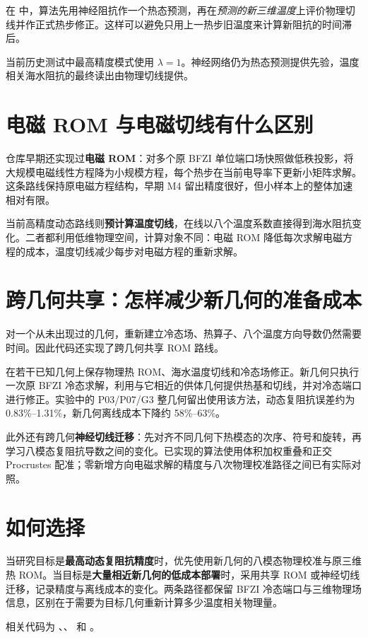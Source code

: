 在  中，算法先用神经阻抗作一个热态预测，再在\emph{预测的新三维温度}上评价物理切线并作正式热步修正。这样可以避免只用上一热步旧温度来计算新阻抗的时间滞后。

当前历史测试中最高精度模式使用 $\lambda=1$。神经网络仍为热态预测提供先验，温度相关海水阻抗的最终读出由物理切线提供。

\section{电磁 ROM 与电磁切线有什么区别}
仓库早期还实现过\textbf{电磁 ROM}：对多个原 BFZI 单位端口场快照做低秩投影，将大规模电磁线性方程降为小规模方程，每个热步在当前电导率下更新小矩阵求解。这条路线保持原电磁方程结构，早期 M4 留出精度很好，但小样本上的整体加速相对有限。

当前高精度动态路线则\textbf{预计算温度切线}，在线以八个温度系数直接得到海水阻抗变化。二者都利用低维物理空间，计算对象不同：电磁 ROM 降低每次求解电磁方程的成本，温度切线减少每步对电磁方程的重新求解。

\section{跨几何共享：怎样减少新几何的准备成本}
对一个从未出现过的几何，重新建立冷态场、热算子、八个温度方向导数仍然需要时间。因此代码还实现了跨几何共享 ROM 路线。

在若干已知几何上保存物理热 ROM、海水温度切线和冷态场修正。新几何只执行一次原 BFZI 冷态求解，利用与它相近的供体几何提供热基和切线，并对冷态端口进行修正。实验中的 P03/P07/G3 整几何留出使用该方法，动态复阻抗误差约为 0.83\%--1.31\%，新几何离线成本下降约 58\%--63\%。

此外还有跨几何\textbf{神经切线迁移}：先对齐不同几何下热模态的次序、符号和旋转，再学习八模态复阻抗导数之间的变化。已实现的算法使用体积加权重叠和正交 Procrustes 配准；零新增方向电磁求解的精度与八次物理校准路径之间已有实际对照。

\section{如何选择}
当研究目标是\textbf{最高动态复阻抗精度}时，优先使用新几何的八模态物理校准与原三维热 ROM。当目标是\textbf{大量相近新几何的低成本部署}时，采用共享 ROM 或神经切线迁移，记录精度与离线成本的变化。两条路径都保留 BFZI 冷态端口与三维物理场信息，区别在于需要为目标几何重新计算多少温度相关物理量。

相关代码为 、、 和 。
